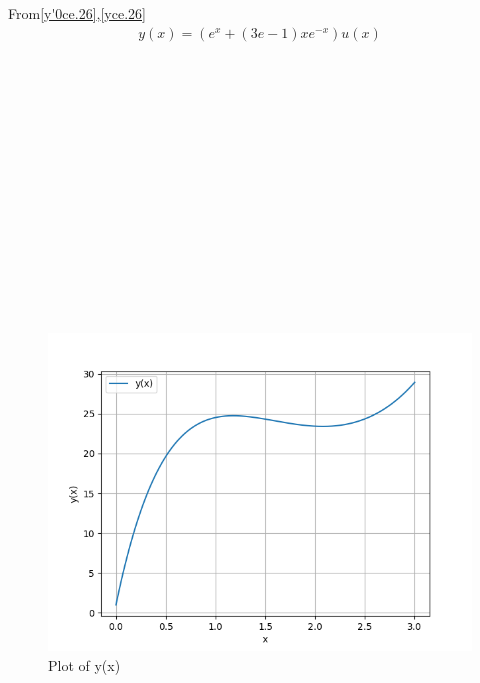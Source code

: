 \documentclass[journal,12pt,twocolumn]{IEEEtran}
\theoremstyle{remark}
\begin{document}
From\eqref{y'0ce.26},\eqref{yce.26}
\begin{align}
	y(x)=(e^x+(3e-1)xe^{-x})u(x)
\end{align}
\\
\\
\\
\\
\\
\\
\\
\\
\\
\\
\\
\\
\\
\\
\begin{figure}[h!]
    \centering
    \includegraphics[width=1\linewidth]{2021/CE/26/figures/figure1.png}
        \caption{Plot of y(x)}
    \label{fig:enter-label}
\end{figure}


\end{document}
